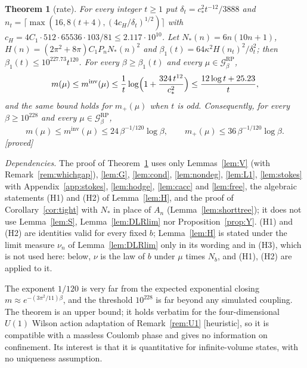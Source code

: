 \documentclass[11pt,a4paper]{article}
\theoremstyle{plain}
\newtheorem{theorem}{Theorem}[section]
\theoremstyle{definition}
\theoremstyle{remark}
\numberwithin{equation}{section}
\newcommand{\st}[1]{\textsf{[#1]}}
\newcommand{\cG}{\mathcal{G}}
\begin{document}
\begin{theorem}[rate]\label{thm:rate}
For every integer $t\ge1$ put $\delta_t=c_*^2t^{-12}/3888$ and $n_t=\lceil\max(16,8(t+4),(4c_H/\delta_t)^{1/2})\rceil$ with
$c_H=4C_1\cdot512\cdot65536\cdot103/81\le2.117\cdot10^{10}$. Let $N_*(n)=6n(10n+1)$, $H(n)=(2\pi^2+8\pi)C_1P_nN_*(n)^2$ and
$\beta_1(t)=64\kappa^2H(n_t)^2/\delta_t^2$; then $\beta_1(t)\le10^{227.73}t^{120}$.
For every $\beta\ge\beta_1(t)$ and every $\mu\in\cG^{\mathrm{RP}}_\beta$,
\[
m(\mu)\le m^{\mathrm{inv}}(\mu)\le\frac1t\log\Bigl(1+\frac{324\,t^{12}}{c_*^2}\Bigr)\le\frac{12\log t+25.23}{t},
\]
and the same bound holds for $m_+(\mu)$ when $t$ is odd. Consequently, for every $\beta\ge10^{228}$ and every $\mu\in\cG^{\mathrm{RP}}_\beta$,
\[
m(\mu)\le m^{\mathrm{inv}}(\mu)\le24\,\beta^{-1/120}\log\beta,\qquad m_+(\mu)\le36\,\beta^{-1/120}\log\beta .
\]
\st{proved}
\end{theorem}
\emph{Dependencies.} The proof of Theorem~\ref{thm:rate} uses only Lemmas~\ref{lem:V} (with Remark~\ref{rem:whichgap}), \ref{lem:G}, \ref{lem:cond}, \ref{lem:nondeg}, \ref{lem:L1}, \ref{lem:stokes} with Appendix~\ref{app:stokes}, \ref{lem:hodge}, \ref{lem:cacc} and \ref{lem:free}, the algebraic statements (H1) and (H2) of Lemma~\ref{lem:H}, and the proof of Corollary~\ref{cor:tight} with $N_*$ in place of $A_n$ (Lemma~\ref{lem:shorttree}); it does not use Lemma~\ref{lem:S}, Lemma~\ref{lem:DLRlim} nor Proposition~\ref{prop:Y}.
(H1) and (H2) are identities valid for every fixed $b$; Lemma~\ref{lem:H} is stated under the limit measure $\nu_n$ of Lemma~\ref{lem:DLRlim} only in its wording and in (H3), which is not used here: below, $\nu$ is the law of $b$ under $\mu$ times $N_b$, and (H1), (H2) are applied to it.

The exponent $1/120$ is very far from the expected exponential closing $m\approx e^{-(3\pi^2/11)\beta}$, and the threshold
$10^{228}$ is far beyond any simulated coupling. The theorem is an upper bound; it holds verbatim for the four-dimensional $U(1)$
Wilson action adaptation of Remark~\ref{rem:U1} \st{heuristic}, so it is compatible with a massless Coulomb phase and gives no
information on confinement. Its interest is that it is quantitative for infinite-volume states, with no uniqueness assumption.
\end{document}
